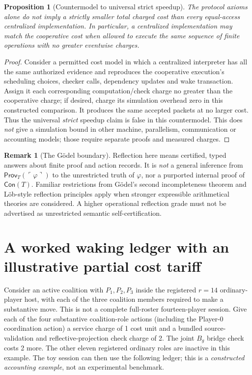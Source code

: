 \documentclass[11pt,letterpaper]{article}
\theoremstyle{definition}
\theoremstyle{plain}
\newtheorem{proposition}[definition]{Proposition}
\theoremstyle{definition}
\newtheorem{remark}[definition]{Remark}
\newcommand{\s}{\mathsf}
\begin{document}
\begin{proposition}[Countermodel to universal strict speedup]
The protocol axioms alone do not imply a strictly smaller total charged cost than \emph{every} equal-access centralized implementation. In particular, a centralized implementation may match the cooperative cost when allowed to execute the same sequence of finite operations with no greater eventwise charges.
\end{proposition}
\begin{proof}
Consider a permitted cost model in which a centralized interpreter has all the same authorized evidence and reproduces the cooperative execution's scheduling choices, checker calls, dependency updates and wake transaction. Assign it each corresponding computation/check charge no greater than the cooperative charge; if desired, charge its simulation overhead zero in this constructed comparison. It produces the same accepted packets at no larger cost. Thus the universal \emph{strict} speedup claim is false in this countermodel. This does \emph{not} give a simulation bound in other machine, parallelism, communication or accounting models; those require separate proofs and measured charges.
\end{proof}

\begin{remark}[The Gödel boundary]
Reflection here means certified, typed answers about finite proof and action records. It is \emph{not} a general inference from $\s{Prov}_T(\ulcorner\varphi\urcorner)$ to the unrestricted truth of $\varphi$, nor a purported internal proof of $\s{Con}(T)$. Familiar restrictions from G\"odel's second incompleteness theorem and L\"ob-style reflection principles \cite{godel-sep} apply when stronger expressible arithmetical theories are considered. A higher operational reflection grade must not be advertised as unrestricted semantic self-certification.
\end{remark}

\section{A worked waking ledger with an illustrative partial cost tariff}\label{gl-first-W0-s14}
Consider an active coalition with $P_1,P_2,P_3$ inside the registered $r=14$ ordinary-player host, with each of the three coalition members required to make a substantive move. This is not a complete full-roster fourteen-player session. Give each of the four substantive coalition-role actions (including the Player-0 coordination action) a service charge of 1 cost unit and a bundled source-validation and reflective-projection check charge of 2. The joint $B_g$ bridge check costs 2 more. The other eleven registered ordinary roles are inactive in this example. The toy session can then use the following ledger; this is a \emph{constructed accounting example}, not an experimental benchmark.
\end{document}
